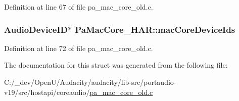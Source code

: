 Definition at line 67 of file pa\+\_\+mac\+\_\+core\+\_\+old.\+c.

\subsubsection[{\texorpdfstring{mac\+Core\+Device\+Ids}{macCoreDeviceIds}}]{\setlength{\rightskip}{0pt plus 5cm}Audio\+Device\+ID$\ast$ Pa\+Mac\+Core\+\_\+\+H\+A\+R\+::mac\+Core\+Device\+Ids}\hypertarget{struct_pa_mac_core___h_a_r_a29ebbcbe4bcf4f59e1b105a9f288abdb}{}\label{struct_pa_mac_core___h_a_r_a29ebbcbe4bcf4f59e1b105a9f288abdb}


Definition at line 72 of file pa\+\_\+mac\+\_\+core\+\_\+old.\+c.



The documentation for this struct was generated from the following file\+:\begin{DoxyCompactItemize}
\item 
C\+:/\+\_\+dev/\+Open\+U/\+Audacity/audacity/lib-\/src/portaudio-\/v19/src/hostapi/coreaudio/\hyperlink{pa__mac__core__old_8c}{pa\+\_\+mac\+\_\+core\+\_\+old.\+c}\end{DoxyCompactItemize}
